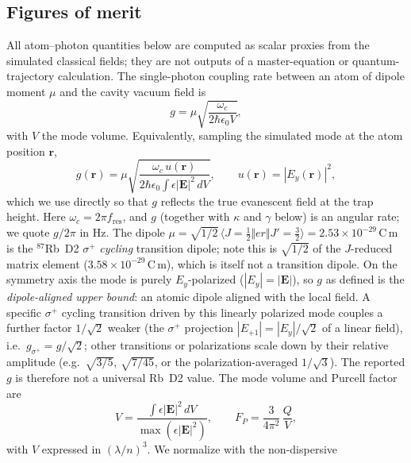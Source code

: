 \documentclass[%
 reprint,
 amsmath,amssymb,
 aps,prx,
 superscriptaddress,
]{revtex4-2}
\newcommand{\unit}[1]{\,\mathrm{#1}}
\begin{document}
\subsection{Figures of merit}

All atom--photon quantities below are computed as scalar proxies from the
simulated classical fields; they are not outputs of a master-equation or
quantum-trajectory calculation. The single-photon coupling rate between an atom
of dipole moment $\mu$ and the cavity vacuum field is
\begin{equation}
g = \mu\sqrt{\frac{\omega_c}{2\hbar\epsilon_0 V}},
\label{eq:g}
\end{equation}
with $V$ the mode volume. Equivalently, sampling the simulated mode at the atom
position $\mathbf r$,
\begin{equation}
g(\mathbf r) = \mu\sqrt{\frac{\omega_c\, u(\mathbf r)}
{2\hbar\epsilon_0 \displaystyle\int \epsilon|\mathbf E|^2\,dV}},
\qquad u(\mathbf r)=|E_y(\mathbf r)|^2,
\label{eq:gfield}
\end{equation}
which we use directly so that $g$ reflects the true evanescent field at the trap
height. Here $\omega_c=2\pi f_\mathrm{res}$, and $g$ (together with $\kappa$ and
$\gamma$ below) is an angular rate; we quote $g/2\pi$ in Hz. The dipole
$\mu=\sqrt{1/2}\,\langle J{=}\tfrac12\Vert er\Vert J'{=}\tfrac32\rangle
=2.53\times10^{-29}\unit{C\,m}$ is the $^{87}$Rb~D2 $\sigma^+$ \emph{cycling}
transition dipole; note this is $\sqrt{1/2}$ of the $J$-reduced matrix element
($3.58\times10^{-29}\unit{C\,m}$), which is itself not a transition dipole. On the
symmetry axis the mode is purely $E_y$-polarized ($|E_y|=|\mathbf E|$), so $g$ as
defined is the \emph{dipole-aligned upper bound}: an atomic dipole aligned with the
local field. A specific $\sigma^+$ cycling transition driven by this linearly
polarized mode couples a further factor $1/\sqrt2$ weaker (the $\sigma^+$ projection
$|E_{+1}|=|E_y|/\sqrt2$ of a linear field), i.e.\ $g_{\sigma^+}=g/\sqrt2$; other
transitions or polarizations scale down by their relative amplitude (e.g.\
$\sqrt{3/5}$, $\sqrt{7/45}$, or the polarization-averaged $1/\sqrt3$). The reported
$g$ is therefore not a universal Rb~D2 value. The
mode volume and Purcell factor are
\begin{equation}
V = \frac{\displaystyle\int\epsilon|\mathbf E|^2\,dV}{\max(\epsilon|\mathbf E|^2)},
\qquad
F_P = \frac{3}{4\pi^2}\,\frac{Q}{V},
\label{eq:V}
\end{equation}
with $V$ expressed in $(\lambda/n)^3$. We normalize with the non-dispersive
\end{document}
